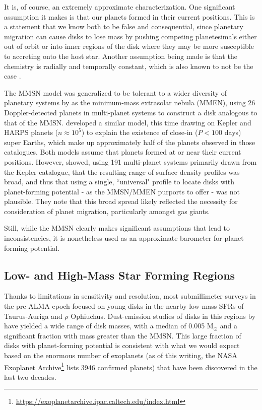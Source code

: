 It is, of course, an extremely approximate characterization. One significant assumption it makes is that our planets formed in their current positions. This is a statement that we know both to be false \citep{Tsiganis2005,Walsh2011} and consequential, since planetary migration can cause disks to lose mass by pushing competing planetesimals either out of orbit or into inner regions of the disk where they may be more susceptible to accreting onto the host star. Another assumption being made is that the chemistry is radially and temporally constant, which is also known to not be the case \citep{vanDishoeckBlake1998}.

The MMSN model was generalized to be tolerant to a wider diversity of planetary systems by \citet{Kuchner2004} as the minimum-mass extrasolar nebula (MMEN), using 26 Doppler-detected planets in multi-planet systems to construct a disk analogous to that of the MMSN. \citet{ChiangLaughlin2013} developed a similar model, this time drawing on Kepler and HARPS planets ($n \approx 10^5$) to explain the existence of close-in ($P < 100$ days) super Earths, which make up approximately half of the planets observed in those catalogues. Both models assume that planets formed at or near their current positions. However, \citet{Raymond2014} showed, using 191 multi-planet systems primarily drawn from the Kepler catalogue, that the resulting range of surface density profiles was broad, and thus that using a single, ``universal" profile to locate disks with planet-forming potential - as the MMSN/MMEN purports to offer - was not plausible. They note that this broad spread likely reflected the necessity for consideration of planet migration, particularly amongst gas giants.

Still, while the MMSN clearly makes significant assumptions that lead to inconsistencies, it is nonetheless used as an approximate barometer for planet-forming potential.




\subsection{Low- and High-Mass Star Forming Regions}
Thanks to limitations in sensitivity and resolution, most submillimeter surveys in the pre-ALMA epoch focused on young disks in the nearby low-mass SFRs of Taurus-Auriga and $\rho$ Ophiuchus. Dust-emission studies of disks in this regions by \citet{AndrewsWilliams2005,AndrewsWilliams2007} have yielded a wide range of disk masses, with a median of 0.005 M$_{\odot}$ and a significant fraction with mass greater than the MMSN. This large fraction of disks with planet-forming potential is consistent with what we would expect based on the enormous number of exoplanets (as of this writing, the NASA Exoplanet Archive\footnote{\url{https://exoplanetarchive.ipac.caltech.edu/index.html}} lists 3946 confirmed planets)  that have been discovered in the last two decades.


